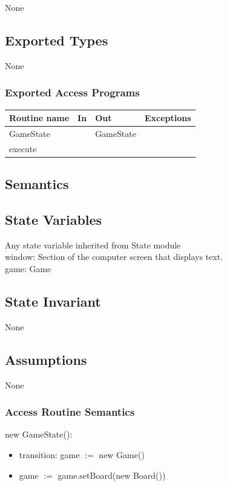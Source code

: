 \documentclass[12pt]{article}
\begin{document}
None

\subsection*{Exported Types}

None

\subsubsection* {Exported Access Programs}

\begin{tabular}{| l | l | l | p{6cm} |}
\hline
\textbf{Routine name} & \textbf{In} & \textbf{Out} & \textbf{Exceptions}\\
\hline
GameState & ~ & GameState & ~ \\
\hline
execute & ~ & ~ & ~ \\
\hline
\end{tabular}

\subsection* {Semantics}

\subsection*{State Variables}

Any state variable inherited from State module\\
window: Section of the computer screen that displays text.\\
game: Game

\subsection*{State Invariant}

None

\subsection*{Assumptions}

None

\subsubsection* {Access Routine Semantics}

\noindent new GameState():
\begin{itemize}
\item transition: game $:=$ new Game()
\item game $:=$ game.setBoard(new Board())
\end{itemize}
\end{document}
